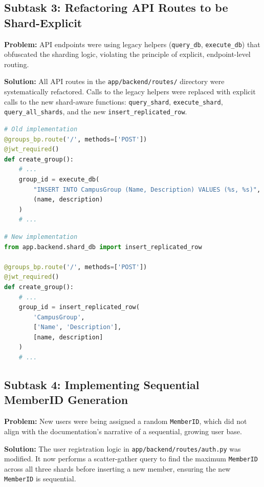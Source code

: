 \documentclass{article}
\begin{document}
\subsection{Subtask 3: Refactoring API Routes to be Shard-Explicit}
\textbf{Problem:} API endpoints were using legacy helpers (\texttt{query\_db}, \texttt{execute\_db}) that obfuscated the sharding logic, violating the principle of explicit, endpoint-level routing.

\textbf{Solution:} All API routes in the \texttt{app/backend/routes/} directory were systematically refactored. Calls to the legacy helpers were replaced with explicit calls to the new shard-aware functions: \texttt{query\_shard}, \texttt{execute\_shard}, \texttt{query\_all\_shards}, and the new \texttt{insert\_replicated\_row}.

\begin{lstlisting}[language=Python, caption={Before: Implicit routing in \texttt{routes/groups.py}}]
# Old implementation
@groups_bp.route('/', methods=['POST'])
@jwt_required()
def create_group():
    # ...
    group_id = execute_db(
        "INSERT INTO CampusGroup (Name, Description) VALUES (%s, %s)",
        (name, description)
    )
    # ...
\end{lstlisting}

\begin{lstlisting}[language=Python, caption={After: Explicit routing in \texttt{routes/groups.py}}]
# New implementation
from app.backend.shard_db import insert_replicated_row

@groups_bp.route('/', methods=['POST'])
@jwt_required()
def create_group():
    # ...
    group_id = insert_replicated_row(
        'CampusGroup',
        ['Name', 'Description'],
        [name, description]
    )
    # ...
\end{lstlisting}

\subsection{Subtask 4: Implementing Sequential MemberID Generation}
\textbf{Problem:} New users were being assigned a random \texttt{MemberID}, which did not align with the documentation's narrative of a sequential, growing user base.

\textbf{Solution:} The user registration logic in \texttt{app/backend/routes/auth.py} was modified. It now performs a scatter-gather query to find the maximum \texttt{MemberID} across all three shards before inserting a new member, ensuring the new \texttt{MemberID} is sequential.
\end{document}
